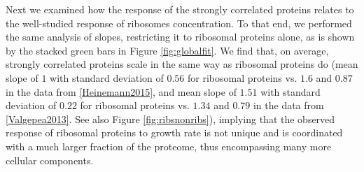 Next we examined how the response of the strongly correlated proteins relates to the well-studied response of ribosomes concentration.
To that end, we performed the same analysis of slopes, restricting it to ribosomal proteins alone, as is shown by the stacked green bars in Figure \ref{fig:globalfit}.
We find that, on average, strongly correlated proteins scale in the same way as ribosomal proteins do (mean slope of $1$ with standard deviation of $0.56$ for ribosomal proteins vs. $1.6$ and $0.87$ in the data from \ref{Heinemann2015}, and mean slope of $1.51$ with standard deviation of $0.22$ for ribosomal proteins vs. $1.34$ and $0.79$ in the data from \ref{Valgepea2013}. See also Figure \ref{fig:ribsnonribs}), implying that the observed response of ribosomal proteins to growth rate is not unique and is coordinated with a much larger fraction of the proteome, thus encompassing many more cellular components.